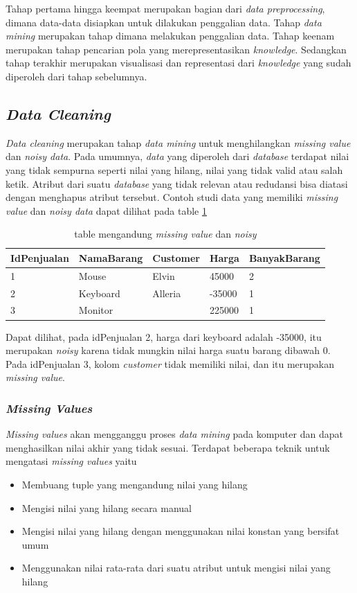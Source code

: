Tahap pertama hingga keempat merupakan bagian dari \textsl{data preprocessing}, dimana data-data disiapkan untuk dilakukan penggalian data. Tahap \textsl{data mining} merupakan tahap dimana melakukan penggalian data. Tahap keenam merupakan tahap pencarian pola yang merepresentasikan \textsl{knowledge}. Sedangkan tahap terakhir merupakan visualisasi dan representasi dari \textsl{knowledge} yang sudah diperoleh dari tahap sebelumnya.


\subsection{\textsl{Data Cleaning}}
\textsl{Data cleaning} merupakan tahap \textsl{data mining} untuk menghilangkan \textsl{missing value} dan \textsl{noisy data}. Pada umumnya, \textsl{data} yang diperoleh dari \textsl{database} terdapat nilai yang tidak sempurna seperti nilai yang hilang, nilai yang tidak valid atau salah ketik. Atribut dari suatu \textsl{database} yang tidak relevan atau redudansi bisa diatasi dengan menghapus atribut tersebut. Contoh studi data yang memiliki \textsl{missing value} dan \textsl{noisy data} dapat dilihat pada table \ref{table:contohMissingNNoisy}

\begin{table}[h]
\caption{table mengandung \textsl{missing value} dan \textsl{noisy}}
\label{table:contohMissingNNoisy}
\begin{tabular}{|l|l|l|l|l|}
\hline
IdPenjualan & NamaBarang & Customer & Harga  & BanyakBarang \\ \hline
1           & Mouse      & Elvin    & 45000  & 2            \\ \hline
2           & Keyboard   & Alleria  & -35000 & 1            \\ \hline
3           & Monitor    &          & 225000 & 1            \\ \hline
\end{tabular}
\end{table}

Dapat dilihat, pada idPenjualan 2, harga dari keyboard adalah -35000, itu merupakan \textsl{noisy} karena tidak mungkin nilai harga suatu barang dibawah 0. Pada idPenjualan 3, kolom \textsl{customer} tidak memiliki nilai, dan itu merupakan \textsl{missing value}.

\subsubsection{\textsl{Missing Values}}
\textsl{Missing values} akan mengganggu proses \textsl{data mining} pada komputer dan dapat menghasilkan nilai akhir yang tidak sesuai. Terdapat beberapa teknik untuk mengatasi \textsl{missing values} yaitu
	\begin{itemize}
		\item Membuang tuple yang mengandung nilai yang hilang\textit{\textit{}}
		\item Mengisi nilai yang hilang secara manual
		\item Mengisi nilai yang hilang dengan menggunakan nilai konstan yang bersifat umum
		\item Menggunakan nilai rata-rata dari suatu atribut untuk mengisi nilai yang hilang
	\end{itemize}
